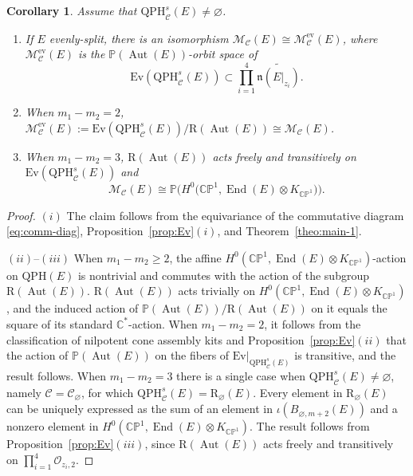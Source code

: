 \documentclass[pdftex]{sigma}
\newcommand{\field}[1]{\ensuremath{\mathbb{#1}}}
\newcommand{\CC}{\field{C}}
\newcommand{\PP}{\field{P}}
\newcommand{\curly}[1]{\mathscr{#1}}
\newcommand{\cM}{\curly{M}}
\newcommand{\cO}{\curly{O}}
\newcommand{\qC}{\mathcal{C}}
\DeclareMathOperator{\Aut}{Aut}
\DeclareMathOperator{\End}{End}
\numberwithin{equation}{section}
\newtheorem{Corollary}[Theorem]{Corollary}
\begin{document}
\begin{Corollary}%
Assume that $\mathrm{QPH}^{s}_{\qC}(E)\neq\varnothing $.
\begin{enumerate}\itemsep=0pt
\item[$(i)$] If $E$ evenly-split, there is an isomorphism $\cM_{\qC}(E)\cong \cM^{\mathrm{ev}}_{\qC}(E)$, where $\cM^{\mathrm{ev}}_{\qC}(E)$ is the $\PP(\Aut(E))$-orbit space of
\[
\mathrm{Ev}(\mathrm{QPH}^{s}_{\qC}(E))\subset \prod_{i=1}^{4}\widetilde{\mathfrak{n}(E\vert_{z_{i}})}.
\]
\item[$(ii)$] When $m_{1}-m_{2}= 2$, $\cM^{\mathrm{ev}}_{\qC}(E):= \mathrm{Ev}(\mathrm{QPH}^{s}_{\qC}(E))/\mathrm{R}(\Aut(E))\cong \cM_{\qC}(E)$.
\item[$(iii)$] When $m_{1}-m_{2}= 3$, $\mathrm{R}(\Aut(E))$ acts freely and transitively on $\mathrm{Ev}(\mathrm{QPH}^{s}_{\qC}(E))$ and
\[
\cM_{\qC}(E)\cong \PP\bigl(H^{0}\bigl(\CC\PP^{1},\End(E)\otimes K_{\CC\PP^{1}}\bigr)\bigr).
\]
\end{enumerate}
\end{Corollary}

\begin{proof}
$(i)$ The claim follows from the equivariance of the commutative diagram \eqref{eq:comm-diag}, Proposition~\ref{prop:Ev}$(i)$, and Theorem~\ref{theo:main-1}.

$(ii)$--$(iii)$ When $m_{1} - m_{2} \geq 2$, the affine $H^{0}(\CC\PP^{1},\End(E)\otimes K_{\CC\PP^{1}})$-action on $\mathrm{QPH}(E)$ is nontrivial and commutes with the action of the subgroup $\mathrm{R}(\Aut(E))$. $\mathrm{R}(\Aut(E))$ acts trivially on $H^{0}(\CC\PP^{1},\End(E)\otimes K_{\CC\PP^{1}})$, and the induced action of $\PP(\Aut(E))/\mathrm{R}(\Aut(E))$ on it equals the square of its standard $\CC^{*}$-action. When $m_{1}-m_{2}=2$, it follows from the classification of nilpotent cone assembly kits and Proposition~\ref{prop:Ev}$(ii)$ that the action of $\PP(\Aut(E))$ on the fibers of $\mathrm{Ev}\vert_{\mathrm{QPH}^{s}_{\qC}(E)}$ is transitive, and the result follows. When $m_{1}-m_{2}=3$ there is a single case when $\mathrm{QPH}^{s}_{\qC}(E)\neq\varnothing $, namely $\qC =\qC_{\varnothing }$, for which $\mathrm{QPH}^{s}_{\qC}(E) = \mathrm{R}_{\varnothing }(E)$. Every element in $\mathrm{R}_{\varnothing }(E)$ can be uniquely expressed as the sum of an element in $\iota(B_{\varnothing ,m+2}(E))$ and a nonzero element in $H^{0}(\CC\PP^{1},\End(E)\otimes K_{\CC\PP^{1}})$. The result follows from Proposition~\ref{prop:Ev}$(iii)$, since $\mathrm{R}(\Aut(E))$ acts freely and transitively on $\prod_{i=1}^{4}\cO_{z_{i},2}$.
\end{proof}
\end{document}
